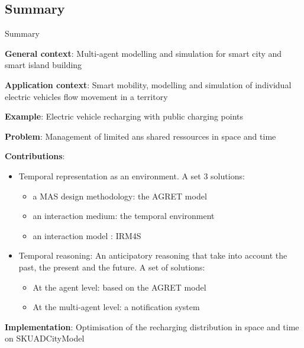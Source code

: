 \subsection{Summary}
\begin{frame}{Summary}
\par \textbf{General context}: Multi-agent modelling and simulation for smart city and smart island building
\par \textbf{Application context}: Smart mobility, modelling and simulation of individual electric vehicles flow movement in a territory
\par \textbf{Example}: Electric vehicle recharging with public charging points
\par \textbf{Problem}: Management of limited ans shared ressources in space and time
\par \textbf{Contributions}:
\begin{itemize}
    \item Temporal representation as an environment. A set 3 solutions: 
    \begin{itemize}
        \item a MAS design methodology: the AGRET model
        \item an interaction medium: the temporal environment
        \item an interaction model : IRM4S
    \end{itemize}
    \item Temporal reasoning: An anticipatory reasoning that take into account the past, the present and the future. A set of solutions: 
    \begin{itemize}
        \item At the agent level: based on the AGRET model
        \item At the multi-agent level: a notification system 
    \end{itemize}
\end{itemize}
\par \textbf{Implementation}: Optimisation of the recharging distribution in space and time on SKUADCityModel


\end{frame}
